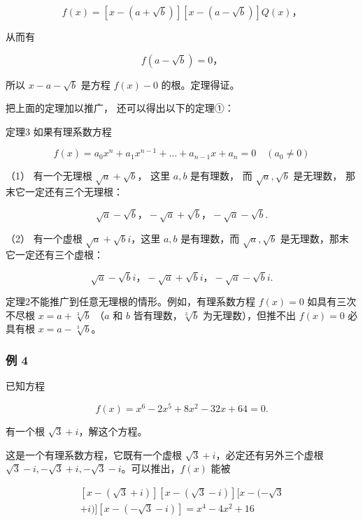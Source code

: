 \[
f (x) = [ x - (a + \sqrt {b}) ] [ x - (a - \sqrt {b}) ] Q (x)\text{，} \tag {5}
\]

从而有

\[
f (a - \sqrt {b}) = 0\text{，}
\]

所以 \(x - a - \sqrt{b}\) 是方程 \(f(x) - 0\) 的根。定理得证。

把上面的定理加以推广， 还可以得出以下的定理①：

定理3 如果有理系数方程

\[
f (x) = a _ {0} x ^ {n} + a _ {1} x ^ {n - 1} + \dots + a _ {n - 1} x + a _ {n} = 0 \quad (a _ {0} \neq 0)
\]

（1） 有一个无理根 \(\sqrt{a} + \sqrt{b}\)， 这里 \(a, b\) 是有理数， 而
\(\sqrt{a}, \sqrt{b}\) 是无理数， 那末它一定还有三个无理根：

\[
\sqrt {a} - \sqrt {b}\text{，} - \sqrt {a} + \sqrt {b}\text{，} - \sqrt {a} - \sqrt {b}.
\]

（2） 有一个虚根 \(\sqrt{a} + \sqrt{b}i\)，这里 \(a, b\) 是有理数，而
\(\sqrt{a}, \sqrt{b}\) 是无理数，那末它一定还有三个虚根：

\[
\sqrt {a} - \sqrt {b} i\text{，} - \sqrt {a} + \sqrt {b} i\text{，} - \sqrt {a} - \sqrt {b} i.
\]

 定理2不能推广到任意无理根的情形。例如，有理系数方程
\(f(x) = 0\) 如具有三次不尽根 \(x = a + \sqrt[3]{b}\) （\(a\) 和 \(b\)
皆有理数，\(\sqrt[3]{b}\) 为无理数），但推不出 \(f(x) = 0\) 必具有根
\(x = a - \sqrt[3]{b}\)。

\subsubsection{例 4}

已知方程

\[
f (x) = x ^ {6} - 2 x ^ {5} + 8 x ^ {2} - 32 x + 64 = 0.
\]

有一个根 \(\sqrt{3} + i\)，解这个方程。

 这是一个有理系数方程，它既有一个虚根
\(\sqrt{3} + i\)，必定还有另外三个虚根
\(\sqrt{3} - i, -\sqrt{3} + i, -\sqrt{3} - i\)。可以推出，\(f(x)\) 能被

\[
\begin{array}{l} [ x - (\sqrt {3} + i) ] [ x - (\sqrt {3} - i) ] [ x - (- \sqrt {3} \\ + i) ] [ x - (- \sqrt {3} - i) ] = x ^ {4} - 4 x ^ {2} + 16 \\ \end{array}
\]

